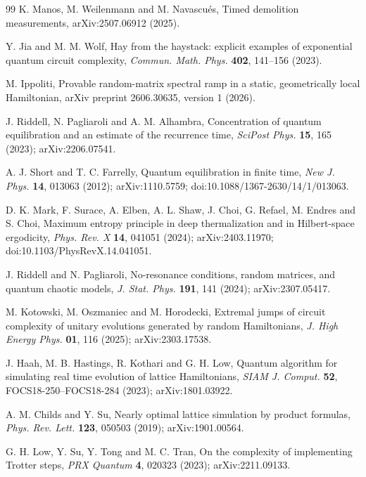 \begin{thebibliography}{99}
K. Manos, M. Weilenmann and M. Navascu\'es,
Timed demolition measurements,
arXiv:2507.06912 (2025).

Y. Jia and M. M. Wolf,
Hay from the haystack: explicit examples of exponential quantum circuit
complexity,
\emph{Commun. Math. Phys.} \textbf{402}, 141--156 (2023).

M. Ippoliti,
Provable random-matrix spectral ramp in a static, geometrically local
Hamiltonian,
arXiv preprint 2606.30635, version 1 (2026).

J. Riddell, N. Pagliaroli and A. M. Alhambra,
Concentration of quantum equilibration and an estimate of the recurrence
time,
\emph{SciPost Phys.} \textbf{15}, 165 (2023);
arXiv:2206.07541.

A. J. Short and T. C. Farrelly,
Quantum equilibration in finite time,
\emph{New J. Phys.} \textbf{14}, 013063 (2012);
arXiv:1110.5759; doi:10.1088/1367-2630/14/1/013063.

D. K. Mark, F. Surace, A. Elben, A. L. Shaw, J. Choi, G. Refael,
M. Endres and S. Choi,
Maximum entropy principle in deep thermalization and in Hilbert-space
ergodicity,
\emph{Phys. Rev. X} \textbf{14}, 041051 (2024);
arXiv:2403.11970; doi:10.1103/PhysRevX.14.041051.

J. Riddell and N. Pagliaroli,
No-resonance conditions, random matrices, and quantum chaotic models,
\emph{J. Stat. Phys.} \textbf{191}, 141 (2024);
arXiv:2307.05417.

M. Kotowski, M. Oszmaniec and M. Horodecki,
Extremal jumps of circuit complexity of unitary evolutions generated by
random Hamiltonians,
\emph{J. High Energy Phys.} \textbf{01}, 116 (2025);
arXiv:2303.17538.

J. Haah, M. B. Hastings, R. Kothari and G. H. Low,
Quantum algorithm for simulating real time evolution of lattice Hamiltonians,
\emph{SIAM J. Comput.} \textbf{52}, FOCS18-250--FOCS18-284 (2023);
arXiv:1801.03922.

A. M. Childs and Y. Su,
Nearly optimal lattice simulation by product formulas,
\emph{Phys. Rev. Lett.} \textbf{123}, 050503 (2019);
arXiv:1901.00564.

G. H. Low, Y. Su, Y. Tong and M. C. Tran,
On the complexity of implementing Trotter steps,
\emph{PRX Quantum} \textbf{4}, 020323 (2023);
arXiv:2211.09133.


\end{thebibliography}

